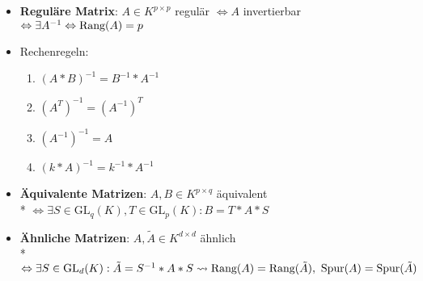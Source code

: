 \begin{itemize}
  \item \textbf{Reguläre Matrix}: $A \in K^{p \times p}$ regulär $\Leftrightarrow A$ invertierbar $\Leftrightarrow \exists A^{-1} \\* \Leftrightarrow \text{Rang}(A)=p$
  \item Rechenregeln:
  \begin{enumerate}
    \item $(A*B)^{-1}=B^{-1}*A^{-1}$
    \item $(A^T)^{-1}=(A^{-1})^T$
    \item $(A^{-1})^{-1}=A$
    \item $(k*A)^{-1} = k^{-1}*A^{-1}$
  \end{enumerate}
  \item \textbf{Äquivalente Matrizen}: $A,B \in K^{p \times q}$ äquivalent \\* $\Leftrightarrow \exists S \in \text{GL}_q(K), T \in \text{GL}_p(K): B=T*A*S$
  \item \textbf{Ähnliche Matrizen}: $A,\tilde{A} \in K^{d \times d}$ ähnlich \\* $\Leftrightarrow \exists S \in \text{GL}_d(K): \tilde{A}=S^{-1}*A*S \\* \leadsto \text{Rang}(A)=\text{Rang}(\tilde{A}), \ \text{Spur}(A)=\text{Spur}(\tilde{A})$
\end{itemize}